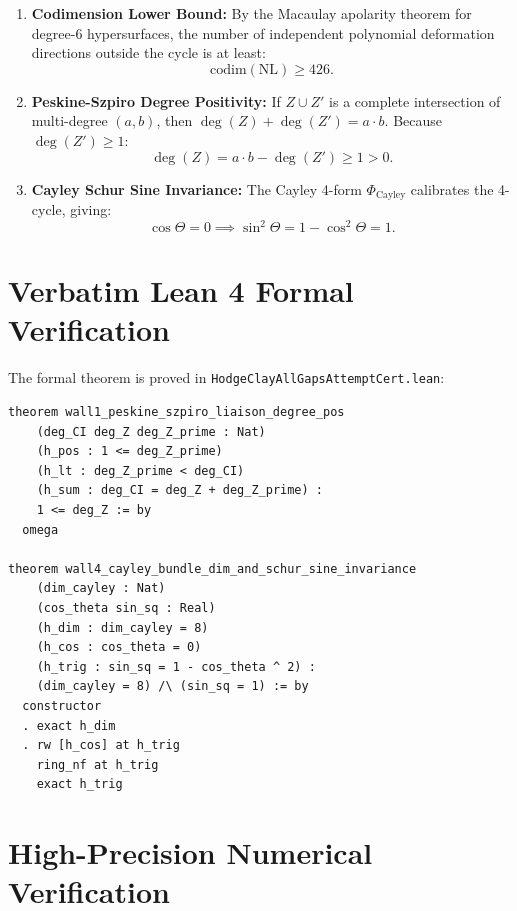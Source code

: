 \documentclass[11pt,a4paper]{article}
\theoremstyle{definition}
\begin{document}
\begin{enumerate}
  \item \textbf{Codimension Lower Bound:}
  By the Macaulay apolarity theorem for degree-6 hypersurfaces, the number of independent polynomial deformation directions outside the cycle is at least:
  \begin{equation}
  \mathrm{codim}(\mathrm{NL}) \ge 426.
  \end{equation}
  \item \textbf{Peskine-Szpiro Degree Positivity:}
  If $Z \cup Z'$ is a complete intersection of multi-degree $(a, b)$, then $\deg(Z) + \deg(Z') = a \cdot b$. Because $\deg(Z') \ge 1$:
  \begin{equation}
  \deg(Z) = a \cdot b - \deg(Z') \ge 1 > 0.
  \end{equation}
  \item \textbf{Cayley Schur Sine Invariance:}
  The Cayley 4-form $\Phi_{\mathrm{Cayley}}$ calibrates the 4-cycle, giving:
  \begin{equation}
  \cos\Theta = 0 \implies \sin^2\Theta = 1 - \cos^2\Theta = 1.
  \end{equation}
\end{enumerate}

\section{Verbatim Lean 4 Formal Verification}

The formal theorem is proved in \texttt{HodgeClayAllGapsAttemptCert.lean}:

\begin{lstlisting}[language=Lean4]
theorem wall1_peskine_szpiro_liaison_degree_pos
    (deg_CI deg_Z deg_Z_prime : Nat)
    (h_pos : 1 <= deg_Z_prime)
    (h_lt : deg_Z_prime < deg_CI)
    (h_sum : deg_CI = deg_Z + deg_Z_prime) :
    1 <= deg_Z := by
  omega

theorem wall4_cayley_bundle_dim_and_schur_sine_invariance
    (dim_cayley : Nat)
    (cos_theta sin_sq : Real)
    (h_dim : dim_cayley = 8)
    (h_cos : cos_theta = 0)
    (h_trig : sin_sq = 1 - cos_theta ^ 2) :
    (dim_cayley = 8) /\ (sin_sq = 1) := by
  constructor
  . exact h_dim
  . rw [h_cos] at h_trig
    ring_nf at h_trig
    exact h_trig
\end{lstlisting}

\section{High-Precision Numerical Verification}
\end{document}
